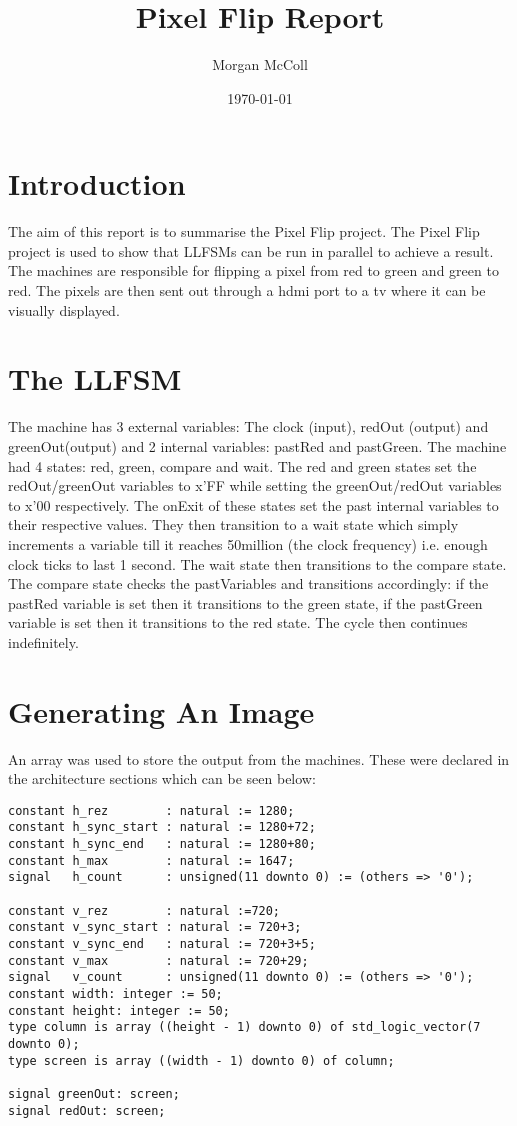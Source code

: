 \documentclass{article}
\begin{document}
	\title{Pixel Flip Report}
	\author{Morgan McColl}
	\date{\today}
	\maketitle
	\section{Introduction}
		The aim of this report is to summarise the Pixel Flip project. The Pixel Flip project is used to show that LLFSMs can be run in parallel to achieve a result. The machines are responsible for flipping a pixel from red to green and green to red. The pixels are then sent out through a hdmi port to a tv where it can be visually displayed.
	\section{The LLFSM}
		The machine has 3 external variables: The clock (input), redOut (output) and greenOut(output) and 2 internal variables: pastRed and pastGreen. The machine had 4 states: red, green, compare and wait. The red and green states set the redOut/greenOut variables to x'FF while setting the greenOut/redOut variables to x'00 respectively. The onExit of these states set the past internal variables to their respective values. They then transition to a wait state which simply increments a variable till it reaches 50million (the clock frequency) i.e. enough clock ticks to last 1 second. The wait state then transitions to the compare state. The compare state checks the pastVariables and transitions accordingly: if the pastRed variable is set then it transitions to the green state, if the pastGreen variable is set then it transitions to the red state. The cycle then continues indefinitely.
	\section{Generating An Image}
		An array was used to store the output from the machines. These were declared in the architecture sections which can be seen below:
		
		\begin{verbatim}
constant h_rez        : natural := 1280;
constant h_sync_start : natural := 1280+72;
constant h_sync_end   : natural := 1280+80;
constant h_max        : natural := 1647;
signal   h_count      : unsigned(11 downto 0) := (others => '0');

constant v_rez        : natural :=720;
constant v_sync_start : natural := 720+3;
constant v_sync_end   : natural := 720+3+5;
constant v_max        : natural := 720+29;
signal   v_count      : unsigned(11 downto 0) := (others => '0');
constant width: integer := 50;
constant height: integer := 50;
type column is array ((height - 1) downto 0) of std_logic_vector(7 downto 0);
type screen is array ((width - 1) downto 0) of column;

signal greenOut: screen;
signal redOut: screen;
		\end{verbatim}
			
\end{document}

